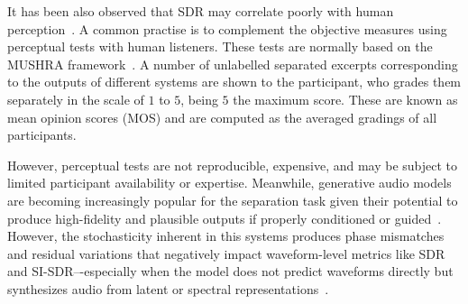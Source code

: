 It has been also observed that SDR may correlate poorly with human perception~\citep{cano-evaluation,guso-losses}. 
A common practise is to complement the objective measures using perceptual tests with human listeners. These tests are normally based on the MUSHRA framework~\citep{schoeffler-webmushra}. A number of unlabelled separated excerpts corresponding to the outputs of different systems are shown to the participant, who grades them separately in the scale of $1$ to $5$, being $5$ the maximum score. These are known as mean opinion scores (MOS) and are computed as the averaged gradings of all participants.


However, perceptual tests are not reproducible, expensive, and may be subject to limited participant availability or expertise. 
%
Meanwhile, generative audio models are becoming increasingly popular for the separation task given their potential to produce high-fidelity and plausible outputs if properly conditioned or guided~\citep{mariani-msdm}. However, the stochasticity inherent in this systems produces phase mismatches and residual variations that negatively impact waveform-level metrics like SDR and SI-SDR–-especially when the model does not predict waveforms directly but synthesizes audio from latent or spectral representations~\citep{karchkhadze-msdm_ldm}.


